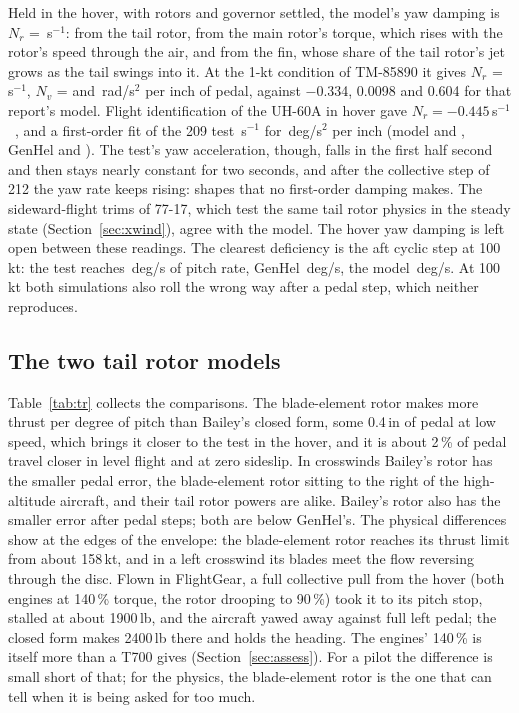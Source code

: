 \documentclass[10pt,a4paper,twocolumn]{article}
\newcommand{\Tab}[1]{}
\begin{document}
Held in the hover, with rotors and governor settled, the model's yaw damping is $N_r$ = \NYdr\,s$^{-1}$: \NYdrtr{} from the tail rotor,
\NYdrmr{} from the main rotor's torque, which rises with the rotor's speed through the air, and \NYdrfin{} from the fin, whose share of the
tail rotor's jet grows as the tail swings into it. At the 1-kt condition of TM-85890 it gives $N_r$ = \NYdhbr\,s$^{-1}$, $N_v$ = \NYdhbv{} and
\NYdhbp\,rad/s$^2$ per inch of pedal, against $-$0.334, 0.0098 and 0.604 for that report's model. Flight identification of the UH-60A in hover
gave $N_r=-0.445$\,s$^{-1}$~\cite{flet}, and a first-order fit of the 209 test \NYawtestNr\,s$^{-1}$ for \NYawtestNp\,deg/s$^2$ per inch
(model \NYawmodNr{} and \NYawmodNp, GenHel \NYawghNr{} and \NYawghNp). The test's yaw acceleration, though, falls in the first half second
and then stays nearly constant for two seconds, and after the collective step of 212 the yaw rate keeps rising: shapes that no first-order
damping makes. The sideward-flight trims of 77-17, which test the same tail rotor physics in the steady state (Section~\ref{sec:xwind}),
agree with the model. The hover yaw damping is left open between these readings. The clearest deficiency is the aft cyclic step at 100\,kt: the test reaches \NQtest\,deg/s of pitch rate,
GenHel \NQgh\,deg/s, the model \NQmod\,deg/s. At 100\,kt both simulations also roll the wrong way after a pedal step, which neither
reproduces.

\subsection{The two tail rotor models}\label{sec:trcomp}
\begin{table}[t]
\centering\small
\caption{The blade-element and Bailey tail rotors against every test that involves the tail rotor. Pedal in per cent of travel or inches;
$^*$ not trimmed (the blade-element rotor at its limit).}\label{tab:tr}
\Tab{tr}
\end{table}
Table~\ref{tab:tr} collects the comparisons. The blade-element rotor makes more thrust per degree of pitch than Bailey's closed form,
some 0.4\,in of pedal at low speed, which brings it closer to the test in the hover, and it is about 2\,\% of pedal travel closer in level flight
and at zero sideslip. In crosswinds Bailey's rotor has the smaller pedal error, the blade-element rotor sitting to the right of the
high-altitude aircraft, and their tail rotor powers are alike. Bailey's rotor also has the smaller error after pedal steps; both are below GenHel's. The physical differences show at the edges of the
envelope: the blade-element rotor reaches its thrust limit from about 158\,kt, and in a left crosswind its blades meet the flow reversing through the disc.
Flown in FlightGear, a full collective pull from the hover (both engines at 140\,\% torque, the rotor drooping to 90\,\%) took it to its
pitch stop, stalled at about 1900\,lb, and the aircraft yawed away against full left pedal; the closed form makes 2400\,lb there and
holds the heading. The engines' 140\,\% is itself more than a T700 gives (Section~\ref{sec:assess}). For a pilot the difference is
small short of that; for the physics, the blade-element rotor is the one that can tell when it is being asked for too much.
\end{document}
